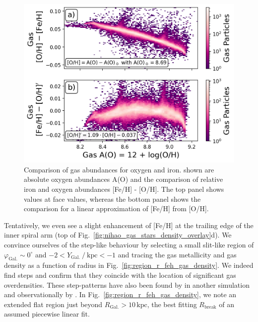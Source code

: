 \documentclass[twocolumn,apj,numberedappendix,appendixfloats,twocolappendix]{openjournal}
\begin{document}
\begin{CJK*}{UTF8}{gbsn}
\begin{figure}
    \centering
    \includegraphics[width=\columnwidth]{figures/fe_h_vs_a_o_gas}
    \caption{Comparison of gas abundances for oxygen and iron. shown are absolute oxygen abundances A(O) and the comparison of relative iron and oxygen abundances [Fe/H] - [O/H]. The top panel shows values at face values, whereas the bottom panel shows the comparison for a linear approximation of [Fe/H] from [O/H].}    \label{fig:fe_h_vs_a_o_gas}
\end{figure}

Tentatively, we even see a slight enhancement of [Fe/H] at the trailing edge of the inner spiral arm (top of Fig.~\ref{fig:nihao_gas_stars_density_overlay}d). We convince ourselves of the step-like behaviour by selecting a small slit-like region of $\varphi_\mathrm{Gal.} \sim 0^\circ$ and $-2 < Y_\mathrm{Gal.}~/~\mathrm{kpc} < -1$ and tracing the gas metallicity and gas density as a function of radius in Fig.~\ref{fig:region_r_feh_gas_density}. We indeed find steps and confirm that they coincide with the location of significant gas overdensities. These step-patterns have also been found by \citet{Grand2015} in another simulation and observationally by \citet{Ho2017c}. In Fig.~\ref{fig:region_r_feh_gas_density}, we note an extended flat region just beyond $R_\mathrm{Gal.} > 10\,\mathrm{kpc}$, the best fitting $R_\mathrm{break}$ of an assumed piecewise linear fit.


\end{CJK*}
\end{document}
